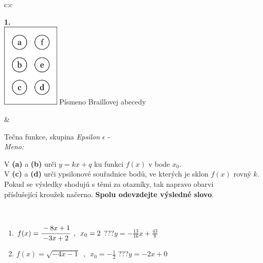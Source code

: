 \documentclass[10pt]{report}
\begin{document}
\begin{tabular}{c:c}
\begin{minipage}[c][104.5mm][t]{0.5\linewidth}
\begin{center}
\begin{minipage}{0.20\linewidth}
\begin{center}
{\Huge\bfseries 1.} \\[2mm]
\includegraphics[height=40mm]{../images/braille.png}
{\small Písmeno Braillovej abecedy}
\end{center}
\end{minipage}
\end{center}
\end{minipage}
&
\begin{minipage}[c][104.5mm][t]{0.5\linewidth}
\begin{center}
\vspace{7mm}
{\huge Tečna funkce, skupina \textit{Epsilon $\epsilon$} -}\\[5mm]
\textit{Meno:}\phantom{xxxxxxxxxxxxxxxxxxxxxxxxxxxxxxxxxxxxxxxxxxxxxxxxxxxxxxxxxxxxxxxxx}\\[5mm]
\begin{minipage}{0.95\linewidth}
\begin{center}
V \textbf{(a)} a \textbf{(b)} urči  $y = kx + q$ ku funkci $f(x)$ v bode $x_0$.\\V \textbf{(c)} a \textbf{(d)} urči ypsilonové souřadnice bodů, ve kterých je sklon $f(x)$ rovný $k$.\\Pokud se výsledky shodujú s těmi za otazníky, tak napravo obarvi\\příslušející kroužek načerno. \textbf{Spolu odevzdejte výsledné slovo}.
\end{center}
\end{minipage}
\\[1mm]
\begin{minipage}{0.79\linewidth}
\begin{center}
\begin{varwidth}{\linewidth}
\begin{enumerate}
\small
\item $f(x)=\cfrac{-8x+1}{-3x+2}\enspace , \enspace x_0=2$\quad \dotfill\; ???\;\dotfill \quad $y = -\frac{13}{16}x+\frac{43}{8}$
\item $f(x)=\sqrt{-4x-1}\enspace , \enspace x_0=-\frac{1}{2}$\quad \dotfill\; ???\;\dotfill \quad $y = -2x+0$

\end{enumerate}
\end{varwidth}
\end{center}
\end{minipage}
\end{center}
\end{minipage}
\end{tabular}
\end{document}
